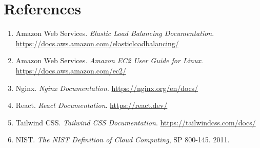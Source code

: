 \documentclass[12pt,a4paper]{article}
\begin{document}
\section*{References}

\begin{enumerate}
  \item Amazon Web Services. \textit{Elastic Load Balancing Documentation}. \url{https://docs.aws.amazon.com/elasticloadbalancing/}
  \item Amazon Web Services. \textit{Amazon EC2 User Guide for Linux}. \url{https://docs.aws.amazon.com/ec2/}
  \item Nginx. \textit{Nginx Documentation}. \url{https://nginx.org/en/docs/}
  \item React. \textit{React Documentation}. \url{https://react.dev/}
  \item Tailwind CSS. \textit{Tailwind CSS Documentation}. \url{https://tailwindcss.com/docs/}
  \item NIST. \textit{The NIST Definition of Cloud Computing}, SP 800-145. 2011.
\end{enumerate}
\end{document}

